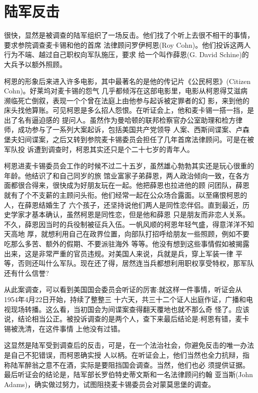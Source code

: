 \documentclass[10pt]{article}
\begin{document}
{\section{陆军反击}

很快，显然是被调查的陆军组织了一场反击。他们找了个听上去很不相干的事情，要求参院调查麦卡锡和他的首席
法律顾问罗伊\textperiodcentered 柯恩(Roy Cohn)。他们投诉这两人行为不端、越过自己职权向军队施压，要求
给一个叫作薛恩(G. David Schine)的大兵予以额外照顾。

柯恩的形象后来进入许多电影，其中最著名的是他的传记片《公民柯恩》(Citizen Cohn)。好莱坞对麦卡锡的怨气
几乎都倾泻在这部电影里，电影从柯恩得艾滋病濒临死亡倒叙，表现一个个曾在法庭上由他参与起诉被定罪者的幻
影，来到他的床头找他算账。可见柯恩是多么招人怨恨。在听证会上，他和麦卡锡一搭一挡，是出了名有逼迫感的
提问人。虽然作为曼哈顿的联邦检察官办公室助理和检方律师，成功参与了一系列大案起诉，包括美国共产党领导
人案、西斯间谍案、卢森堡夫妇间谍案，之后又转到参院麦卡锡委员会担任了几年首席法律顾问。可是在被军队投
诉遭到调查时，柯恩其实还只是个二十七岁的青年人。

柯恩进麦卡锡委员会工作的时候不过二十五岁，虽然雄心勃勃其实还是玩心很重的年龄。他结识了和自己同岁的旅
馆业富家子弟薛恩，两人政治倾向一致，在各方面都很合得来，很快成为好朋友玩在一起。他把薛恩也拉进他的顾
问团队，薛恩就有了个不支薪的主顾问头衔。他们经常一起在公众场合露面。以至痛恨柯恩的人，在薛恩结婚生了
六个孩子，还坚持说他们两人是同性恋伴侣。直到最近，历史学家才基本确认，虽然柯恩是同性恋，但是他和薛恩
只是朋友而非恋人关系。不久，薛恩因当时的兵役制被征兵入伍。一帆风顺的柯恩年轻气盛，得意洋洋不知天高地
厚，就想利用自己在政界位置，向部队打招呼给朋友一些照顾，例如不要吃那么多苦、额外的假期、不要派驻海外
等等。他没有想到这些事情假如被揭露出来，这是非常严重的官员违规。对美国人来说，兵就是兵，穿上军装一律
平等，否则还叫什么军队。现在还了得，居然连当兵都想利用职权享受特权，那军队还有什么信誉?

从此案调查，可以看到美国国会委员会听证的厉害:就这样一件事情，听证会从1954年4月22日开始，持续了整整三
十六天，共三十二个证人出庭作证，广播和电视现场转播。这么看，当初国会为间谍案查得翻天覆地也就不那么奇
怪了。应该说，结论相当公正。被投诉调查的是两个人，查下来最后结论是:柯恩有错，麦卡锡被洗清，在这件事情
上他没有过错。

这显然是陆军受到调查后的反击，可是，在一个法治社会，你避免反击的唯一办法是自己不犯错误，而柯恩确实授
人以柄。在听证会上，他们当然也全力抗辩，指称陆军醉翁之意不在酒，实际是要阻挡国会调查。当然，他们也必
须提供证据。最后听证会的结论是，陆军部长罗伯特\textperiodcentered 史蒂文斯和一名法律顾问约翰
\textperiodcentered 亚当斯(John Adams)，确实做过努力，试图阻挠麦卡锡委员会对蒙莫思堡的调查。

}
\end{document}

